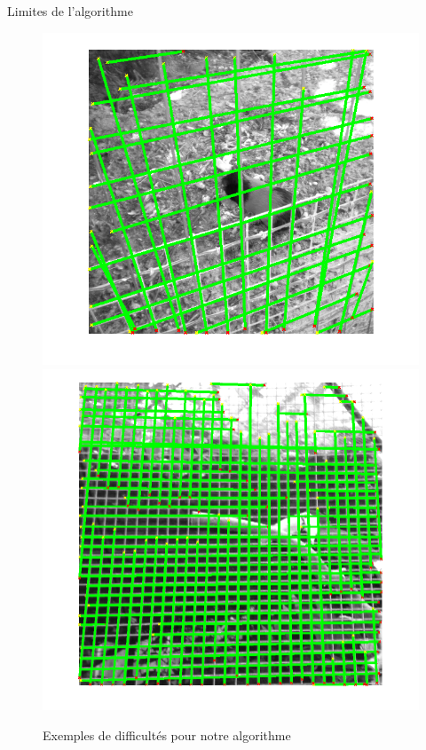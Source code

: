 \begin{frame}{Limites de l'algorithme}
\begin{figure}
\begin{center}
\includegraphics[width = 0.5\columnwidth]{fig/double.png}
\includegraphics[width = 0.5\columnwidth]{fig/toucanraff.png}
\caption{\label{difficile}Exemples de difficultés pour notre algorithme}
\end{center}
\end{figure}
\end{frame}


